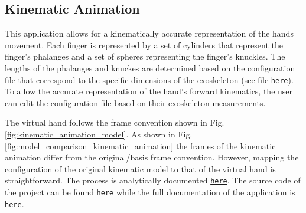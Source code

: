 \subsection{Kinematic Animation}
This application allows for a kinematically accurate representation of the 
hands movement. Each finger is represented by a set of cylinders that represent 
the finger's phalanges and a set of spheres representing the finger's 
knuckles. The lengths of the phalanges and knuckes are determined based on 
the configuration file that correspond to the specific dimensions of the 
exoskeleton (see file \texttt{\href{https://github.com/amartsop/KinematicsAnimationMultiThread/blob/master/share/hand_config.json}{here}}).
To allow the accurate representation of the hand's forward kinematics, the 
user can edit the configuration file based on their exoskeleton measurements.

The virtual hand follows the frame convention shown in Fig. \ref{fig:kinematic_animation_model}.
As shown in Fig.\ref{fig:model_comparison_kinematic_animation} the 
frames of the kinematic animation differ from the original/basis frame 
convention. However, mapping the configuration of the original kinematic model 
to that of the virtual hand is straightforward. The process is analytically
documented 
\texttt{\href{https://amartsop.github.io/KinematicsAnimationMultiThread/classAnimatedHand.html}{here}}.
The source code of the project can be found 
\texttt{\href{https://github.com/amartsop/KinematicsAnimationMultiThread}{here}}
while the full documentation of the application is
\texttt{\href{https://amartsop.github.io/KinematicsAnimationMultiThread/index.html}{here}}.

